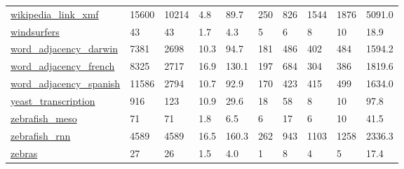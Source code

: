 \begin{longtable}{llllllllll}
 \href{http://konect.cc/networks/wikipedia_link_en}{wikipedia\_link\_xmf}                                                     & 15600      & 10214 & 4.8    & 89.7   & 250   & 826    & 1544   & 1876   & 5091.0  \\
 \href{http://konect.cc/networks/moreno_beach}{windsurfers}                                                                 & 43         & 43    & 1.7    & 4.3    & 5     & 6      & 8      & 10     & 18.9    \\
 \href{https://doi.org/10.1126/science.1089167}{word\_adjacency\_darwin}                                                      & 7381       & 2698  & 10.3   & 94.7   & 181   & 486    & 402    & 484    & 1594.2  \\
 \href{https://doi.org/10.1126/science.1089167}{word\_adjacency\_french}                                                      & 8325       & 2717  & 16.9   & 130.1  & 197   & 684    & 304    & 386    & 1819.6  \\
 \href{https://doi.org/10.1126/science.1089167}{word\_adjacency\_spanish}                                                     & 11586      & 2794  & 10.7   & 92.9   & 170   & 423    & 415    & 499    & 1634.0  \\
 \href{http://www.weizmann.ac.il/mcb/UriAlon/download/collection-complex-networks}{yeast\_transcription}                     & 916        & 123   & 10.9   & 29.6   & 18    & 58     & 8      & 10     & 97.8    \\
 \href{http://dx.doi.org/10.1016/j.neuron.2019.04.034}{zebrafish\_meso}                                                      & 71         & 71    & 1.8    & 6.5    & 6     & 17     & 6      & 10     & 41.5    \\
 \href{http://dx.doi.org/\%2010.1016/j.neuron.2021.06.007}{zebrafish\_rnn}                                                    & 4589       & 4589  & 16.5   & 160.3  & 262   & 943    & 1103   & 1258   & 2336.3  \\
 \href{http://konect.cc/networks/moreno_zebra}{zebras}                                                                      & 27         & 26    & 1.5    & 4.0    & 1     & 8      & 4      & 5      & 17.4    \\
\hline
\end{longtable}
